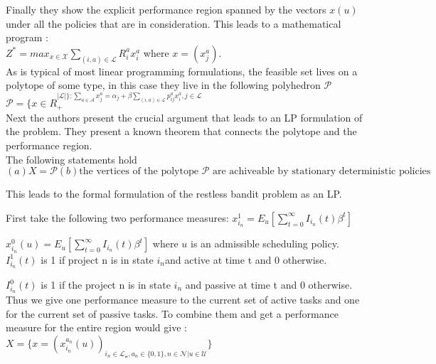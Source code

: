 Finally they show the explicit performance region spanned by the vectors $x(u)$ under all the policies that are in consideration. This leads to a mathematical program : \\

$Z^* = max_{x \in \mathcal{X}}\sum_{(i,a)\in \mathcal{L}}R_i^a x_i^a$ where $x = (x_j^a)$. \\

As is typical of most linear programming formulations, the feasible set lives on a polytope of some type, in this case they live in the following polyhedron $\mathcal {P}$ \\

$\mathcal{P} = \{ x \in R_+^{|\mathcal{L}| \}: \sum_{a \in \mathcal{A}} x_j^a = \alpha_j 
+ \beta \sum_{(i,a) \in \mathcal{L}} p_{ij}^a x_i^a, j  \in \mathcal{L} }$ \\

Next the authors present the crucial argument that leads to an LP formulation of the problem.
They present a known theorem that connects the polytope and the performance region.\\

The following statements hold
\begin{equation}
(a) X = \mathcal{P}
(b)\text{the vertices of the polytope } \mathcal{P} \text{ are achiveable by stationary deterministic policies}
\end{equation}

This leads to the formal formulation of the restless bandit problem as an LP.

First take the following two performance measures:
$x_{i_n}^1 = E_u[\sum_{t=0}^{\infty} I_{i_n}(t)\beta^t]$ 

$x_{i_n}^0(u) = E_u[\sum_{t=0}^{\infty}I_{i_n}(t) \beta^t]$ where $u$ is an admissible scheduling policy.  \\

$I_{i_n}^1(t)$ is 1 if project n is in state $i_n$and active at time t and 0 otherwise.

$I_{i_n}^0(t)$ is 1 if the project n is in state $i_n$ and passive at time t and 0 otherwise.\\

Thus we give one performance measure to the current set of active tasks and one for the current set of passive tasks. To combine them and get a performance measure for the entire region would give : \\


$X = \{x = (x_{i_n}^{a_n}(u))_{i_n \in \mathcal{L_n}, a_n \in\{0,1\}, n \in \mathcal{N}|u \in \mathcal{U}}\}$\\

